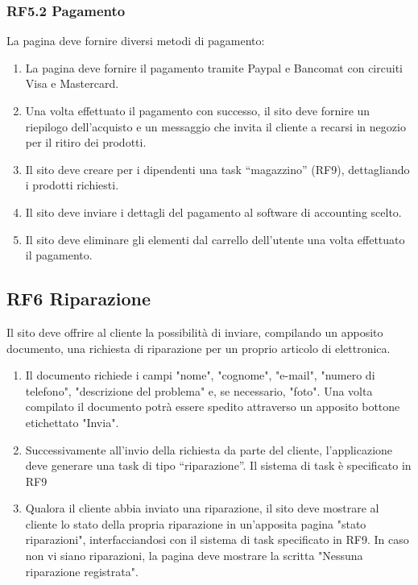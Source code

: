 \documentclass{report}
\begin{document}
\subsubsection*{RF5.2 Pagamento}
La pagina deve fornire diversi metodi di pagamento:

\begin{enumerate}

	\item La pagina deve fornire il pagamento tramite Paypal e Bancomat con circuiti Visa e Mastercard.

	\item Una volta effettuato il pagamento con successo, il sito deve fornire un riepilogo dell’acquisto e un messaggio che invita il cliente a recarsi in negozio per il ritiro dei prodotti.
	\item Il sito deve creare per i dipendenti una task “magazzino” (RF9), dettagliando i prodotti richiesti.
	\item Il sito deve inviare i dettagli del pagamento al software di accounting scelto.
	\item Il sito deve eliminare gli elementi dal carrello dell’utente una volta effettuato il pagamento.
\end{enumerate}

\subsection*{RF6 Riparazione}

Il sito deve offrire al cliente la possibilità di inviare, compilando un apposito documento, una richiesta di riparazione per un proprio articolo di elettronica.
\begin{enumerate}


	\item Il documento richiede i campi "nome", "cognome", "e-mail", "numero di telefono", "descrizione del problema" e, se necessario, "foto". Una volta compilato il documento potrà essere spedito attraverso un apposito bottone etichettato "Invia".
	
	\item Successivamente all’invio della richiesta da parte del cliente, l’applicazione deve generare una task di tipo “riparazione”. Il sistema di task è specificato in RF9
	
	\item Qualora il cliente abbia inviato una riparazione, il sito deve mostrare al cliente lo stato della propria riparazione in un'apposita pagina "stato riparazioni", interfacciandosi con il sistema di task specificato in RF9. In caso non vi siano riparazioni, la pagina deve mostrare la scritta "Nessuna riparazione registrata".
	
\end{enumerate}
\end{document}
